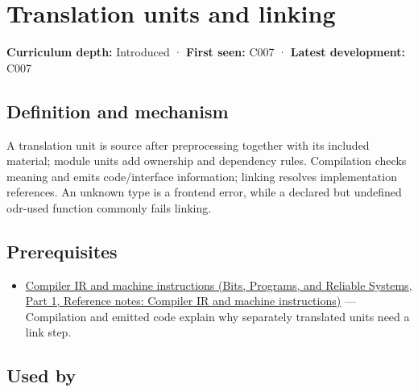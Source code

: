 \hypertarget{appendix-806686359e1b}{}\label{referencestart:appendix-806686359e1b}
\section{Translation units and linking}\label{appendix-806686359e1b-translation-units-and-linking}

\hypertarget{appendix-806686359e1b-translation-units-and-linking}{}

\textbf{Curriculum depth:} Introduced · \textbf{First seen:} C007 · \textbf{Latest development:} C007

\begin{allmightroledefinition}

\subsection{Definition and mechanism}\label{appendix-806686359e1b-definition-and-mechanism}

\hypertarget{appendix-806686359e1b-definition-and-mechanism}{}

A translation unit is source after preprocessing together with its included material; module units add ownership and dependency rules. Compilation checks meaning and emits code/interface information; linking resolves implementation references. An unknown type is a frontend error, while a declared but undefined odr-used function commonly fails linking.

\end{allmightroledefinition}

\subsection{Prerequisites}\label{appendix-806686359e1b-prerequisites}

\hypertarget{appendix-806686359e1b-prerequisites}{}

\begin{itemize}
\tightlist
\item
  \href{../01-Bits-Programs-and-Reliable-Systems-P01/main.pdf\#appendix-942ad41afb30}{Compiler IR and machine instructions (Bits, Programs, and Reliable Systems, Part 1, Reference notes: Compiler IR and machine instructions)} --- Compilation and emitted code explain why separately translated units need a link step.
\end{itemize}

\subsection{Used by}\label{appendix-806686359e1b-used-by}


